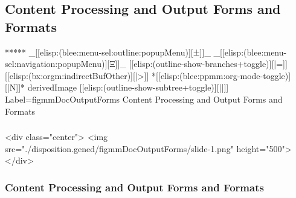 \begin{whenOrg}
\section{Content Processing and Output Forms and Formats}


\begin{whenOrg}
*****  _[[elisp:(blee:menu-sel:outline:popupMenu)][±]]_ _[[elisp:(blee:menu-sel:navigation:popupMenu)][Ξ]]_ [[elisp:(outline-show-branches+toggle)][|=]] [[elisp:(bx:orgm:indirectBufOther)][|>]] *[[elisp:(blee:ppmm:org-mode-toggle)][|N]]*  derivedImage [[elisp:(outline-show-subtree+toggle)][||]] Label=figmmDocOutputForms Content Processing and Output Forms and Formats
\end{whenOrg}

\begin{htmlonly}

\begin{frame}[fragile,plain,label=figmmDocOutputForms]
    \frametitle{}
    \framesubtitle{}
    \begin{rawhtml}
<div class="center">
<img src="./disposition.gened/figmmDocOutputForms/slide-1.png" height="500">
</div>
    \end{rawhtml}
\end{frame}
\end{htmlonly}

\begin{verblatex}

\begin{frame}[fragile,plain,label=figmmDocOutputForms]
    \frametitle{Content Processing and Output Forms and Formats}
    \framesubtitle{}

\end{frame}
\end{verblatex}
\end{whenOrg}
